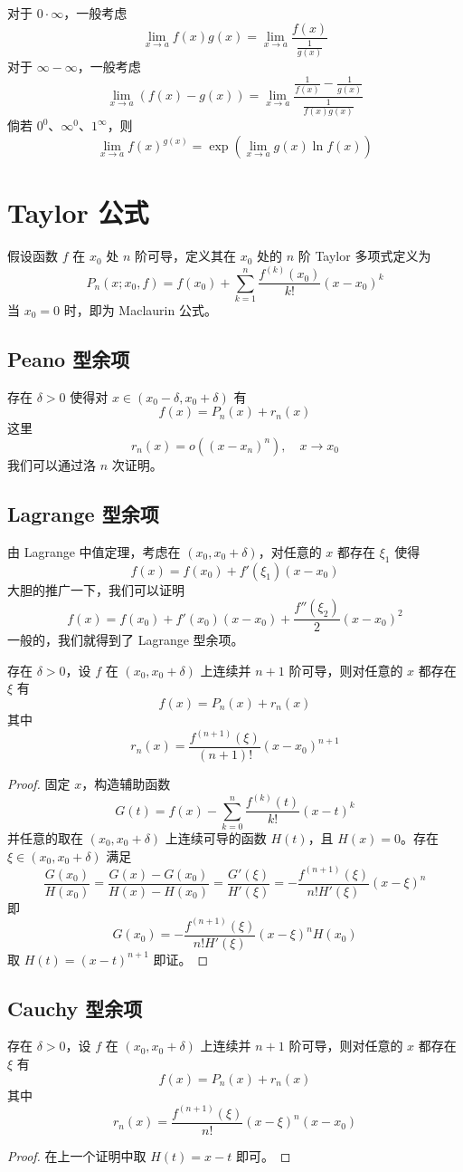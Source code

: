 对于 $0 \cdot \infty$，一般考虑
\[ \lim_{x \to a} f(x) g(x) = \lim_{x \to a} \frac{f(x)}{\frac{1}{g(x)}} \]
对于 $\infty - \infty$，一般考虑
\[ \lim_{x \to a} (f(x) - g(x)) = \lim_{x \to a} \frac{\frac{1}{f(x)} - \frac{1}{g(x)}}{\frac{1}{f(x)g(x)}} \]
倘若 $0^0$、$\infty^0$、$1^\infty$，则
\[ \lim_{x \to a} f(x)^{g(x)} = \exp \left(\lim_{x \to a} g(x) \ln f(x) \right) \]

\section{Taylor 公式}

假设函数 $f$ 在 $x_0$ 处 $n$ 阶可导，定义其在 $x_0$ 处的 $n$ 阶 Taylor 多项式定义为
\[ P_n(x;x_0, f) = f(x_0) + \sum_{k=1}^{n} \frac{f^{(k)}(x_0)}{k!} (x-x_0)^k \]
当 $x_0 = 0$ 时，即为 Maclaurin 公式。

\subsection{Peano 型余项}
存在 $\delta > 0$ 使得对 $x \in (x_0 - \delta, x_0 + \delta)$ 有
\[ f(x) = P_n(x) + r_n(x) \]
这里
\[ r_n(x) = o((x-x_n)^n), \quad x \to x_0 \]
我们可以通过洛 $n$ 次证明。

\subsection{Lagrange 型余项}
由 Lagrange 中值定理，考虑在 $(x_0, x_0 + \delta)$，对任意的 $x$ 都存在 $\xi_1$ 使得
\[ f(x) = f(x_0) + f'(\xi_1)(x-x_0) \]
大胆的推广一下，我们可以证明
\[ f(x) = f(x_0) + f'(x_0)(x-x_0) + \frac{f''(\xi_2)}{2}(x-x_0)^2 \]
一般的，我们就得到了 Lagrange 型余项。

\begin{theorem}
	存在 $\delta > 0$，设 $f$ 在 $(x_0, x_0+\delta)$ 上连续并 $n + 1$ 阶可导，则对任意的 $x$ 都存在 $\xi$ 有
	\[ f(x) = P_n(x) + r_n(x) \]
	其中
	\[ r_n(x) = \frac{f^{(n+1)}(\xi)}{(n+1)!}(x-x_0)^{n+1} \]
\end{theorem}

\begin{proof}
	固定 $x$，构造辅助函数
	\[ G(t) = f(x) - \sum_{k=0}^n \frac{f^{(k)}(t)}{k!} (x-t)^k \]
	并任意的取在 $(x_0, x_0 + \delta)$ 上连续可导的函数 $H(t)$，且 $H(x) = 0$。存在 $\xi \in (x_0, x_0 + \delta)$ 满足
	\[ \frac{G(x_0)}{H(x_0)} = \frac{G(x) - G(x_0)}{H(x) - H(x_0)} = \frac{G'(\xi)}{H'(\xi)} = -\frac{f^{(n+1)}(\xi)}{n!H'(\xi)}(x-\xi)^n \]
	即
	\[ G(x_0) = -\frac{f^{(n+1)}(\xi)}{n! H'(\xi)}(x-\xi)^nH(x_0) \]
	取 $H(t) = (x-t)^{n+1}$ 即证。
\end{proof}

\subsection{Cauchy 型余项}

\begin{theorem}
	存在 $\delta > 0$，设 $f$ 在 $(x_0, x_0+\delta)$ 上连续并 $n + 1$ 阶可导，则对任意的 $x$ 都存在 $\xi$ 有
	\[ f(x) = P_n(x) + r_n(x) \]
	其中
	\[ r_n(x) = \frac{f^{(n+1)}(\xi)}{n!}(x-\xi)^n(x-x_0) \]
\end{theorem}

\begin{proof}
	在上一个证明中取 $H(t) = x - t$ 即可。
\end{proof}

